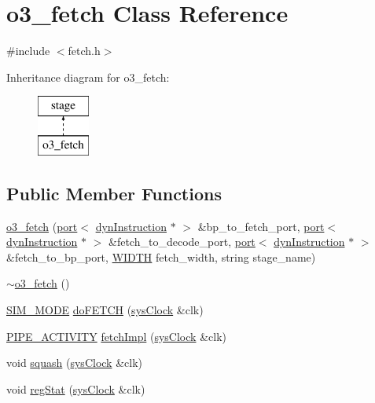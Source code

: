 \hypertarget{classo3__fetch}{
\section{o3\_\-fetch Class Reference}
\label{classo3__fetch}
}


{\ttfamily \#include $<$fetch.h$>$}

Inheritance diagram for o3\_\-fetch:\begin{figure}[H]
\begin{center}
\leavevmode
\includegraphics[height=2.000000cm]{classo3__fetch}
\end{center}
\end{figure}
\subsection*{Public Member Functions}
\begin{DoxyCompactItemize}
\item 
\hyperlink{classo3__fetch_a891511bce60bdcd499b599da711d62e2}{o3\_\-fetch} (\hyperlink{classport}{port}$<$ \hyperlink{classdynInstruction}{dynInstruction} $\ast$ $>$ \&bp\_\-to\_\-fetch\_\-port, \hyperlink{classport}{port}$<$ \hyperlink{classdynInstruction}{dynInstruction} $\ast$ $>$ \&fetch\_\-to\_\-decode\_\-port, \hyperlink{classport}{port}$<$ \hyperlink{classdynInstruction}{dynInstruction} $\ast$ $>$ \&fetch\_\-to\_\-bp\_\-port, \hyperlink{global_2global_8h_a6fa2e24b8a418fa215e183264cbea3aa}{WIDTH} fetch\_\-width, string stage\_\-name)
\item 
\hyperlink{classo3__fetch_ab7a66f1ecf6c3a82af1d7f0a4dc6a819}{$\sim$o3\_\-fetch} ()
\item 
\hyperlink{unit_2stage_8h_ac68af0001af4b7049b2435ded74c4e5e}{SIM\_\-MODE} \hyperlink{classo3__fetch_a504eff13df91f086a8db237a6b98c9e7}{doFETCH} (\hyperlink{classsysClock}{sysClock} \&clk)
\item 
\hyperlink{unit_2stage_8h_ab00e4188e8b8974fecb1dfd12764cbb1}{PIPE\_\-ACTIVITY} \hyperlink{classo3__fetch_a87124ad19a418d931aff507eaacfb60f}{fetchImpl} (\hyperlink{classsysClock}{sysClock} \&clk)
\item 
void \hyperlink{classo3__fetch_a90a02763ec511000d70d4c2a5d2774bf}{squash} (\hyperlink{classsysClock}{sysClock} \&clk)
\item 
void \hyperlink{classo3__fetch_af499f0a4a59dbb59dc8de189058032a5}{regStat} (\hyperlink{classsysClock}{sysClock} \&clk)
\end{DoxyCompactItemize}


